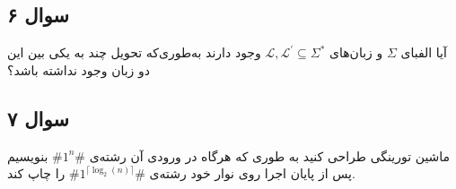 \documentclass{scribe-or}
\begin{document}
\subsection*{ سوال ۶}
آیا الفبای 
$\Sigma$
و زبان‌های 
$\mathcal{L},\mathcal{L}^\prime \subseteq \Sigma^*$
وجود دارند به‌طوری‌که تحویل چند به یکی بین این دو زبان وجود نداشته باشد؟

\subsection*{ سوال ۷}
ماشین تورینگی طراحی کنید به طوری که هرگاه در ورودی آن رشته‌ی 
$\#1^n\#$
بنویسیم پس از پایان اجرا روی نوار خود رشته‌ی 
$\#1^{\lceil\log_2(n)\rceil}\#$
را چاپ کند.
\end{document}
